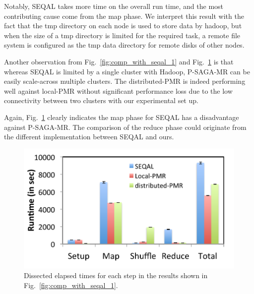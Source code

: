 \documentclass{sig-alternate}
\begin{document}
Notably, SEQAL takes more time on the overall run time, and the most contributing cause come from the map phase.  We interpret this result with the fact that the tmp directory on each node is used to store data by hadoop, but when the size of a tmp directory is limited for the required task, a remote file system is configured as  the tmp data directory for remote disks of other nodes.

Another observation from Fig.~\ref{fig:comp_with_seqal_1} and Fig.~\ref{fig:comp_with_seqal_2} is that whereas SEQAL is limited by a single cluster with Hadoop, P-SAGA-MR can be easily scale-across multiple clusters. The distributed-PMR is indeed performing well against local-PMR without significant performance loss due to the low connectivity between two clusters with our experimental set up.  

Again, Fig.~\ref{fig:comp_with_seqal_2} clearly indicates the map phase for SEQAL has a disadvantage against P-SAGA-MR.  The comparison of the reduce phase could originate from the different implementation between SEQAL and ours.

\begin{figure} 
 \centering
\includegraphics[scale=0.50]{figures/8GB_phasewisetimes.pdf}
\caption{\small  Dissected elapsed times for each step in the results shown in Fig.~\ref{fig:comp_with_seqal_1}.  }
  \label{fig:comp_with_seqal_2} 
\end{figure}
\end{document}
